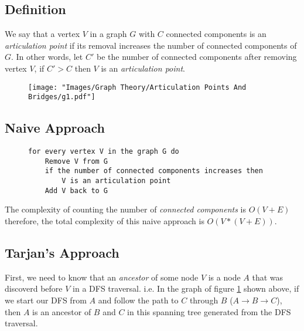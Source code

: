 \vspace*{2em}
\subsection*{Definition}
We say that a vertex $V$ in a graph $G$ with $C$
connected components is an \textit{articulation point} if its removal increases the number of connected components of $G$.
In other words, let $C'$ be the number of connected components after removing vertex $V$, if $C' > C$ then $V$ is an \textit{articulation point}.

\begin{figure}[H]
  \centering
  \texttt{[image: "Images/Graph Theory/Articulation Points And Bridges/g1.pdf"]}
  \caption{}
  \label{fig:apb_g1}
\end{figure}

\subsection*{Naive Approach}

\begin{figure}[thp]
  \centering
  \begin{minipage}[c]{0.9\textwidth}
    \begin{verbatim}
for every vertex V in the graph G do
    Remove V from G
    if the number of connected components increases then
        V is an articulation point
    Add V back to G
      \end{verbatim}
  \end{minipage}
\end{figure}

The complexity of counting the number of \textit{connected components} is $O(V + E)$ therefore,
the total complexity of this naive approach is $O(V * (V + E))$.

\subsection*{Tarjan's Approach}

First, we need to know that an \textit{ancestor} of some node $V$ is a node $A$ that was discoverd
before $V$ in a DFS traversal. i.e. In the graph of figure \ref{fig:apb_g1} shown above, if we start
our DFS from $A$ and follow the path to $C$ through $B$ ($A \rightarrow B \rightarrow C$), then $A$
is an ancestor of $B$ and $C$ in this spanning tree generated from the DFS traversal.\\

